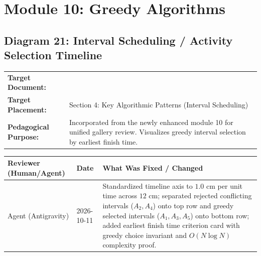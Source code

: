 \documentclass[11pt,a4paper]{article}
\newcommand{\breadcrumb}[3]{
    \par\vspace{0.15cm}
    \noindent\begin{tabularx}{\textwidth}{|l|X|}
    \hline
    \textbf{Target Document:} & \texttt{\detokenize{#1}} \\
    \textbf{Target Placement:} & #2 \\
    \textbf{Pedagogical Purpose:} & #3 \\
    \hline
    \end{tabularx}
    \vspace{0.15cm}\par
}
\newcommand{\diagramaudit}[3]{
    \par\vspace{0.12cm}
    \noindent\begin{tabularx}{\textwidth}{|l|l|>{\raggedright\arraybackslash}X|}
    \hline
    \textbf{Reviewer (Human/Agent)} & \textbf{Date} & \textbf{What Was Fixed / Changed} \\ \hline
    #1 & #2 & #3 \\ \hline
    \end{tabularx}
    \vspace{0.12cm}\par
}
\begin{document}
\newpage
\section{Module 10: Greedy Algorithms}

\subsection{Diagram 21: Interval Scheduling / Activity Selection Timeline}

\breadcrumb{10.greedy_algorithms.tex}{Section 4: Key Algorithmic Patterns (Interval Scheduling)}{Incorporated from the newly enhanced module 10 for unified gallery review. Visualizes greedy interval selection by earliest finish time.}

\diagramaudit{Agent (Antigravity)}{2026-10-11}{Standardized timeline axis to $1.0\text{ cm}$ per unit time across $12\text{ cm}$; separated rejected conflicting intervals ($A_2, A_4$) onto top row and greedy selected intervals ($A_1, A_3, A_5$) onto bottom row; added earliest finish time criterion card with greedy choice invariant and $O(N \log N)$ complexity proof.}
\end{document}
